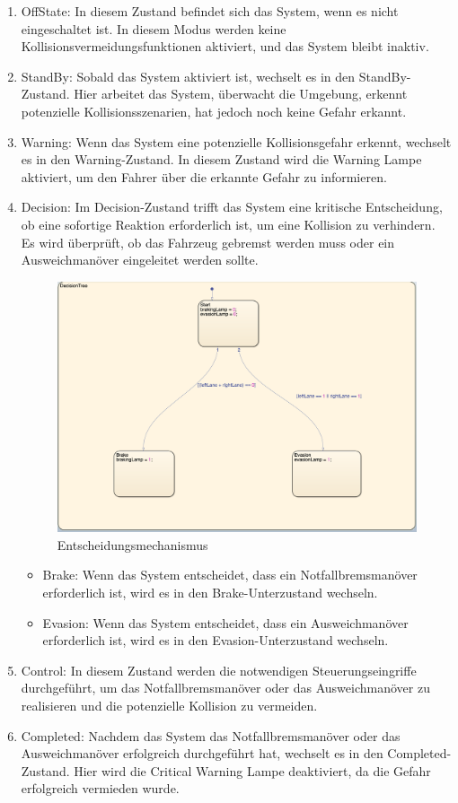 \begin{enumerate}
	\item OffState: In diesem Zustand befindet sich das System, wenn es nicht eingeschaltet ist. In diesem Modus werden keine Kollisionsvermeidungsfunktionen aktiviert, und das System bleibt inaktiv.
	\item StandBy: Sobald das System aktiviert ist, wechselt es in den StandBy-Zustand. Hier arbeitet das System, überwacht die Umgebung, erkennt potenzielle Kollisionsszenarien, hat jedoch noch keine Gefahr erkannt.
	\item Warning: Wenn das System eine potenzielle Kollisionsgefahr erkennt, wechselt es in den Warning-Zustand. In diesem Zustand wird die Warning Lampe aktiviert, um den Fahrer über die erkannte Gefahr zu informieren.
	\item Decision: Im Decision-Zustand trifft das System eine kritische Entscheidung, ob eine sofortige Reaktion erforderlich ist, um eine Kollision zu verhindern. Es wird überprüft, ob das Fahrzeug gebremst werden muss oder ein Ausweichmanöver eingeleitet werden sollte.
	\begin{figure}[H]
		\centering	
		\includegraphics[width=.8\textwidth]{img/entscheidung}
		\caption[Zustände]{Entscheidungsmechanismus}
		\label{fig:Unterzustände von DecisionTree}
	\end{figure}
	\begin{itemize}
		\item Brake: Wenn das System entscheidet, dass ein Notfallbremsmanöver erforderlich ist, wird es in den Brake-Unterzustand wechseln.
		\item Evasion: Wenn das System entscheidet, dass ein Ausweichmanöver erforderlich ist, wird es in den Evasion-Unterzustand wechseln.
	\end{itemize}
	\item Control: In diesem Zustand werden die notwendigen Steuerungseingriffe durchgeführt, um das Notfallbremsmanöver oder das Ausweichmanöver zu realisieren und die potenzielle Kollision zu vermeiden.
	\item Completed: Nachdem das System das Notfallbremsmanöver oder das Ausweichmanöver erfolgreich durchgeführt hat, wechselt es in den Completed-Zustand. Hier wird die Critical Warning Lampe deaktiviert, da die Gefahr erfolgreich vermieden wurde.
\end{enumerate}

